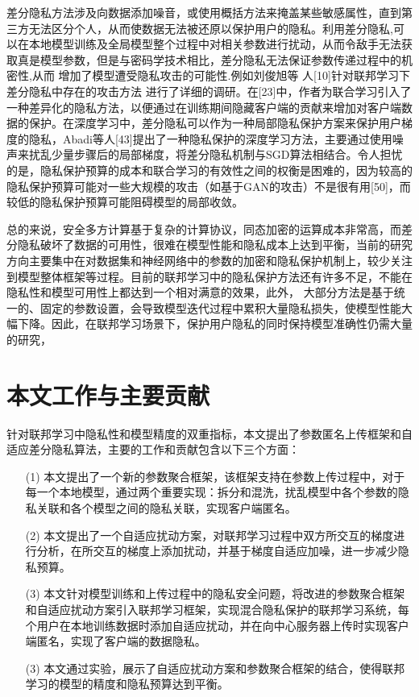 差分隐私方法涉及向数据添加噪音，或使用概括方法来掩盖某些敏感属性，直到第三方无法区分个人，从而使数据无法被还原以保护用户的隐私。利用差分隐私,可以在本地模型训练及全局模型整个过程中对相关参数进行扰动，从而令敌手无法获取真是模型参数，但是与密码学技术相比，差分隐私无法保证参数传递过程中的机密性,从而 增加了模型遭受隐私攻击的可能性.例如刘俊旭等 人[10]针对联邦学习下差分隐私中存在的攻击方法 进行了详细的调研。在[23]中，作者为联合学习引入了一种差异化的隐私方法，以便通过在训练期间隐藏客户端的贡献来增加对客户端数据的保护。在深度学习中，差分隐私可以作为一种局部隐私保护方案来保护用户梯度的隐私，Abadi等人[43]提出了一种隐私保护的深度学习方法，主要通过使用噪声来扰乱少量步骤后的局部梯度，将差分隐私机制与SGD算法相结合。令人担忧的是，隐私保护预算的成本和联合学习的有效性之间的权衡是困难的，因为较高的隐私保护预算可能对一些大规模的攻击（如基于GAN的攻击）不是很有用[50]，而较低的隐私保护预算可能阻碍模型的局部收敛。


总的来说，安全多方计算基于复杂的计算协议，同态加密的运算成本非常高，而差分隐私破坏了数据的可用性，很难在模型性能和隐私成本上达到平衡，当前的研究方向主要集中在对数据集和神经网络中的参数的加密和隐私保护机制上，较少关注到模型整体框架等过程。目前的联邦学习中的隐私保护方法还有许多不足，不能在隐私性和模型可用性上都达到一个相对满意的效果，此外， 大部分方法是基于统一的、固定的参数设置，会导致模型迭代过程中累积大量隐私损失，使模型性能大幅下降。因此，在联邦学习场景下，保护用户隐私的同时保持模型准确性仍需大量的研究，


\section{本文工作与主要贡献}
针对联邦学习中隐私性和模型精度的双重指标，本文提出了参数匿名上传框架和自适应差分隐私算法，主要的工作和贡献包含以下三个方面：
\begin{enumerate}
\item [(1)] 本文提出了一个新的参数聚合框架，该框架支持在参数上传过程中，对于每一个本地模型，通过两个重要实现：拆分和混洗，扰乱模型中各个参数的隐私关联和各个模型之间的隐私关联，实现客户端匿名。
\item [(2)] 本文提出了一个自适应扰动方案，对联邦学习过程中双方所交互的梯度进行分析，在所交互的梯度上添加扰动，并基于梯度自适应加噪，进一步减少隐私预算。
\item [(3)] 本文针对模型训练和上传过程中的隐私安全问题，将改进的参数聚合框架和自适应扰动方案引入联邦学习框架，实现混合隐私保护的联邦学习系统，每个用户在本地训练数据时添加自适应扰动，并在向中心服务器上传时实现客户端匿名，实现了客户端的数据隐私。
\item [(3)] 本文通过实验，展示了自适应扰动方案和参数聚合框架的结合，使得联邦学习的模型的精度和隐私预算达到平衡。
\end{enumerate}

